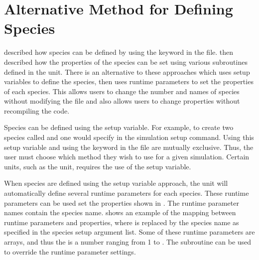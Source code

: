 \section{Alternative Method for Defining Species}
\label{Sec:DefineSpecies2}

 described how species can be defined by
using the  keyword in the 
file.  then described how the properties of
the species can be set using various subroutines defined in the
 unit. There is an alternative to these approaches
which uses setup variables to define the species, then uses runtime
parameters to set the properties of each species. This allows users to
change the number and names of species without modifying the
 file and also allows users to change properties without
recompiling the code.

Species can be defined using the  setup variable. For
example, to create two species called  and  one
would specify  in the simulation setup
command. Using this setup variable and using the 
keyword in the  file are mutually exclusive. Thus, the
user must choose which method they wish to use for a given
simulation. Certain units, such as the  unit, requires
the use of the setup variable.

When species are defined using the setup variable approach, the
 unit will automatically define several runtime
parameters for each species. These runtime parameters can be used set
the properties shown in . The
runtime parameter names contain the species
name.  shows an example of the mapping
between runtime parameters and  properties, where
 is replaced by the species name as specified in the
species setup argument list. Some of these runtime parameters are
arrays, and thus the  is a number ranging from 1 to
. The  subroutine can
be used to override the runtime parameter settings.

